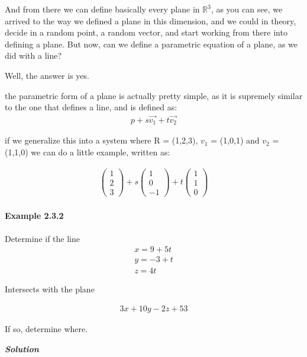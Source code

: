 \documentclass[11pt,fleqn]{book} %
\begin{document}
And from there we can define basically every plane in $\mathbb{R}^3$, as you can see, we arrived to the way we defined a plane in this dimension, and we could in theory, decide in a random point, a random vector, and start working from there into defining a plane.
But now, can we define a parametric equation of a plane, as we did with a line?

Well, the answer is yes.

the parametric form of a plane is actually pretty simple, as it is supremely similar to 
the one that defines a line, and is defined as:
\begin{gather}
    p + s\vec{v_1} + t \vec{v_2}
\end{gather}

if we generalize this into a system where R = (1,2,3), $v_1$ = (1,0,1) and $v_2$ = (1,1,0)
we can do a little example, written as:

\begin{gather}
    \begin{pmatrix}
        1\\2\\3
    \end{pmatrix} + s \begin{pmatrix}
        1\\0\\-1
    \end{pmatrix} + t\begin{pmatrix}
        1\\1\\0
    \end{pmatrix}
\end{gather}

\paragraph{Example 2.3.2}

Determine if the line 
\begin{gather}
    x = 9+5t\\
    y = -3+t\\
    z= 4t
\end{gather}

Intersects with the plane

\begin{gather}
    3x + 10y -2z+ 53
\end{gather}

If so, determine where.

\textit{\textbf{Solution}}
\end{document}
